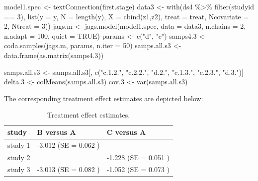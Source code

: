 \documentclass[
  letterpaper,
  DIV=11,
  numbers=noendperiod]{scrreprt}
\newenvironment{Shaded}{\begin{snugshade}}{\end{snugshade}}
\newcommand{\AttributeTok}[1]{\textcolor[rgb]{0.40,0.45,0.13}{#1}}
\newcommand{\ConstantTok}[1]{\textcolor[rgb]{0.56,0.35,0.01}{#1}}
\newcommand{\DecValTok}[1]{\textcolor[rgb]{0.68,0.00,0.00}{#1}}
\newcommand{\FloatTok}[1]{\textcolor[rgb]{0.68,0.00,0.00}{#1}}
\newcommand{\FunctionTok}[1]{\textcolor[rgb]{0.28,0.35,0.67}{#1}}
\newcommand{\NormalTok}[1]{\textcolor[rgb]{0.00,0.23,0.31}{#1}}
\newcommand{\OtherTok}[1]{\textcolor[rgb]{0.00,0.23,0.31}{#1}}
\newcommand{\SpecialCharTok}[1]{\textcolor[rgb]{0.37,0.37,0.37}{#1}}
\newcommand{\StringTok}[1]{\textcolor[rgb]{0.13,0.47,0.30}{#1}}
\begin{document}
\begin{Shaded}
\begin{Highlighting}[]
\NormalTok{model1.spec }\OtherTok{\textless{}{-}} \FunctionTok{textConnection}\NormalTok{(first.stage) }
\NormalTok{data3 }\OtherTok{\textless{}{-}} \FunctionTok{with}\NormalTok{(ds4 }\SpecialCharTok{\%\textgreater{}\%} \FunctionTok{filter}\NormalTok{(studyid }\SpecialCharTok{==} \DecValTok{3}\NormalTok{), }
              \FunctionTok{list}\NormalTok{(}\AttributeTok{y =}\NormalTok{ y,}
                   \AttributeTok{N =} \FunctionTok{length}\NormalTok{(y), }
                   \AttributeTok{X =} \FunctionTok{cbind}\NormalTok{(z1,z2),  }
                   \AttributeTok{treat =}\NormalTok{ treat,}
                   \AttributeTok{Ncovariate =} \DecValTok{2}\NormalTok{, }
                   \AttributeTok{Ntreat =} \DecValTok{3}\NormalTok{))}
\NormalTok{jags.m }\OtherTok{\textless{}{-}} \FunctionTok{jags.model}\NormalTok{(model1.spec, }\AttributeTok{data =}\NormalTok{ data3, }\AttributeTok{n.chains =} \DecValTok{2}\NormalTok{, }\AttributeTok{n.adapt =} \DecValTok{100}\NormalTok{,}
                     \AttributeTok{quiet =} \ConstantTok{TRUE}\NormalTok{)}
\NormalTok{params }\OtherTok{\textless{}{-}} \FunctionTok{c}\NormalTok{(}\StringTok{"d"}\NormalTok{, }\StringTok{"c"}\NormalTok{) }
\NormalTok{samps4}\FloatTok{.3} \OtherTok{\textless{}{-}} \FunctionTok{coda.samples}\NormalTok{(jags.m, params, }\AttributeTok{n.iter =} \DecValTok{50}\NormalTok{)}
\NormalTok{samps.all.s3 }\OtherTok{\textless{}{-}} \FunctionTok{data.frame}\NormalTok{(}\FunctionTok{as.matrix}\NormalTok{(samps4}\FloatTok{.3}\NormalTok{))}

\NormalTok{samps.all.s3 }\OtherTok{\textless{}{-}}\NormalTok{ samps.all.s3[, }\FunctionTok{c}\NormalTok{(}\StringTok{"c.1.2."}\NormalTok{, }\StringTok{"c.2.2."}\NormalTok{, }\StringTok{"d.2."}\NormalTok{, }\StringTok{"c.1.3."}\NormalTok{, }
                                 \StringTok{"c.2.3."}\NormalTok{, }\StringTok{"d.3."}\NormalTok{)]}
\NormalTok{delta}\FloatTok{.3} \OtherTok{\textless{}{-}} \FunctionTok{colMeans}\NormalTok{(samps.all.s3)}
\NormalTok{cov}\FloatTok{.3} \OtherTok{\textless{}{-}} \FunctionTok{var}\NormalTok{(samps.all.s3)}
\end{Highlighting}
\end{Shaded}

The corresponding treatment effect estimates are depicted below:

\hypertarget{tbl-results_nma_stage1}{}
\begin{table}[!h]
\caption{\label{tbl-results_nma_stage1}Treatment effect estimates. }\tabularnewline

\centering
\begin{tabular}{lll}
\toprule
study & B versus A & C versus A\\
\midrule
study 1 & -3.012 (SE =  0.062 ) & \\
study 2 &  & -1.228 (SE =  0.051 )\\
study 3 & -3.013 (SE =  0.082 ) & -1.052 (SE =  0.073 )\\
\bottomrule
\end{tabular}
\end{table}
\end{document}
